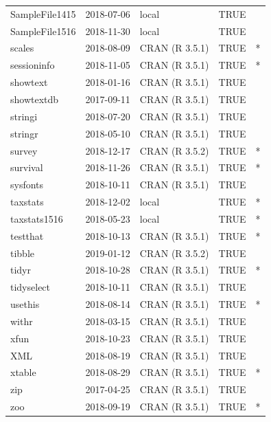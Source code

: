 \documentclass{grattan}\usepackage[]{graphicx}\usepackage[]{color}
\begin{document}
\begin{longtable}{lllll}
  SampleFile1415 & 2018-07-06 & local & TRUE &  \\ 
  SampleFile1516 & 2018-11-30 & local & TRUE &  \\ 
  scales & 2018-08-09 & CRAN (R 3.5.1) & TRUE & * \\ 
  sessioninfo & 2018-11-05 & CRAN (R 3.5.1) & TRUE & * \\ 
  showtext & 2018-01-16 & CRAN (R 3.5.1) & TRUE &  \\ 
  showtextdb & 2017-09-11 & CRAN (R 3.5.1) & TRUE &  \\ 
  stringi & 2018-07-20 & CRAN (R 3.5.1) & TRUE &  \\ 
  stringr & 2018-05-10 & CRAN (R 3.5.1) & TRUE &  \\ 
  survey & 2018-12-17 & CRAN (R 3.5.2) & TRUE & * \\ 
  survival & 2018-11-26 & CRAN (R 3.5.1) & TRUE & * \\ 
  sysfonts & 2018-10-11 & CRAN (R 3.5.1) & TRUE &  \\ 
  taxstats & 2018-12-02 & local & TRUE & * \\ 
  taxstats1516 & 2018-05-23 & local & TRUE & * \\ 
  testthat & 2018-10-13 & CRAN (R 3.5.1) & TRUE & * \\ 
  tibble & 2019-01-12 & CRAN (R 3.5.2) & TRUE &  \\ 
  tidyr & 2018-10-28 & CRAN (R 3.5.1) & TRUE & * \\ 
  tidyselect & 2018-10-11 & CRAN (R 3.5.1) & TRUE &  \\ 
  usethis & 2018-08-14 & CRAN (R 3.5.1) & TRUE & * \\ 
  withr & 2018-03-15 & CRAN (R 3.5.1) & TRUE &  \\ 
  xfun & 2018-10-23 & CRAN (R 3.5.1) & TRUE &  \\ 
  XML & 2018-08-19 & CRAN (R 3.5.1) & TRUE &  \\ 
  xtable & 2018-08-29 & CRAN (R 3.5.1) & TRUE & * \\ 
  zip & 2017-04-25 & CRAN (R 3.5.1) & TRUE &  \\ 
  zoo & 2018-09-19 & CRAN (R 3.5.1) & TRUE & * \\ 
   \bottomrule
\end{longtable}


\clearpage
\end{document}
